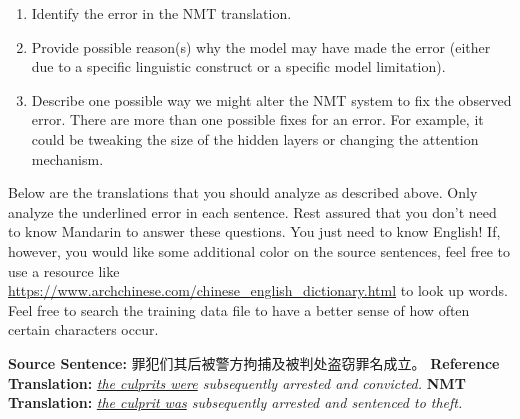 \begin{parts}
    \begin{enumerate}
        \item Identify the error in the NMT translation.
        \item Provide possible reason(s) why the model may have made the error (either due to a specific linguistic construct or a specific model limitation).
        \item Describe one possible way we might alter the NMT system to fix the observed error. There are more than one possible fixes for an error. For example, it could be tweaking the size of the hidden layers or changing the attention mechanism.
    \end{enumerate}
    
    Below are the translations that you should analyze as described above. Only analyze the underlined error in each sentence. Rest assured that you don't need to know Mandarin to answer these questions. You just need to know English! If, however, you would like some additional color on the source sentences, feel free to use a resource like \url{https://www.archchinese.com/chinese_english_dictionary.html} to look up words. Feel free to search the training data file to have a better sense of how often certain characters occur.

    \begin{subparts}
        \subpart[2]
        \textbf{Source Sentence:} 罪犯们其后被警方拘捕及被判处盗窃罪名成立。\newline
        \textbf{Reference Translation:} \textit{\underline{the culprits were} subsequently arrested and convicted.}\newline
        \textbf{NMT Translation:} \textit{\underline{the culprit was} subsequently arrested and sentenced to theft.}
        
\end{subparts}
\end{parts}
